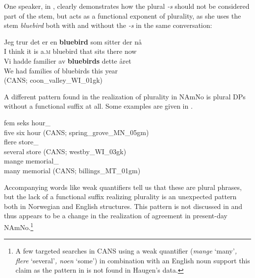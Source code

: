 \documentclass[output=paper]{langscibook}
\begin{document}
One speaker, in , clearly demonstrates how the plural \textit{{}-s} should not be considered part of the stem, but acts as a functional exponent of plurality, as she uses the stem \textit{bluebird} both with and without the \textit{{}-s} in the same conversation: 


\ea\label{ex:riksem:21}
\ea 
\gll Jeg trur  det er en   \textbf{bluebird} som sitter der     nå\\
	 I     think it    is  a.\textsc{m} bluebird that  sits    there now\\
    
\ex
\gll Vi    hadde familier av \textbf{bluebirds} dette året \\
	 We had      families of bluebirds this    year   \\
     \glt (CANS; %
     coon\_valley\_WI\_01gk)
\z
\z



A different pattern found in the realization of plurality in NAmNo is plural DPs without a functional suffix at all. Some examples are given in . 


\ea\label{ex:riksem:22}
\ea 
\gll fem seks hour\_\\
	 five six hour (CANS; %
     spring\_grove\_MN\_05gm)\\
\ex 
\gll flere store\_\\
	 several store (CANS; %
     westby\_WI\_03gk)\\
\ex 
\gll mange memorial\_\\
	many memorial (CANS; %
    billings\_MT\_01gm)\\
\z
\z



Accompanying words like weak quantifiers tell us that these are plural phrases, but the lack of a functional suffix realizing plurality is an unexpected pattern both in Norwegian and English structures. This pattern is not discussed in \citet{Haugen1953} and thus appears to be a change in the realization of agreement in present-day NAmNo.\footnote{ \textrm{A few targeted searches in CANS using a weak quantifier (}\textrm{\textit{mange} }\textrm{‘many’}\textrm{\textit{, flere} }\textrm{‘several’}\textrm{\textit{, noen} }\textrm{‘some’) in combination with an English noun support this claim as the pattern in  is not found in Haugen’s data.} }
\end{document}
